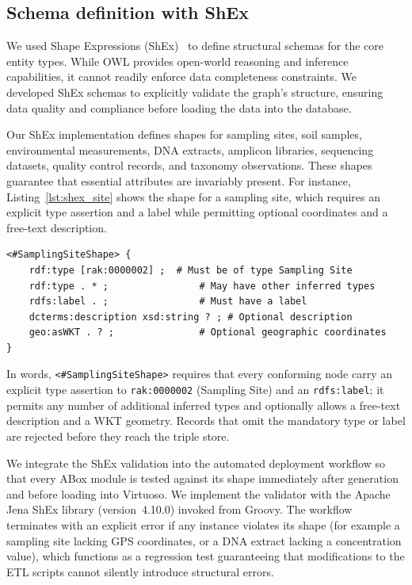 \documentclass[11pt,a4paper]{article}
\begin{document}
\subsection{Schema definition with ShEx}\label{subsec:shex}

We used Shape Expressions (ShEx)~\cite{shex} to define structural
schemas for the core entity types. While OWL provides open-world
reasoning and inference capabilities, it cannot readily enforce data
completeness constraints. We developed ShEx schemas to explicitly
validate the graph's structure, ensuring data quality and compliance
before loading the data into the database.

Our ShEx implementation defines shapes for sampling sites, soil
samples, environmental measurements, DNA extracts, amplicon
libraries, sequencing datasets, quality control records, and
taxonomy observations. These shapes guarantee that essential
attributes are invariably present. For instance,
Listing~\ref{lst:shex_site} shows the shape for a sampling site,
which requires an explicit type assertion and a label while
permitting optional coordinates and a free-text description.

\begin{lstlisting}[caption={ShEx shape for Sampling Site validation.},
  label={lst:shex_site}, basicstyle=\ttfamily\scriptsize, frame=single]
<#SamplingSiteShape> {
    rdf:type [rak:0000002] ;  # Must be of type Sampling Site
    rdf:type . * ;                # May have other inferred types
    rdfs:label . ;                # Must have a label
    dcterms:description xsd:string ? ; # Optional description
    geo:asWKT . ? ;               # Optional geographic coordinates
}
\end{lstlisting}

In words, \texttt{<\#SamplingSiteShape>} requires that every
conforming node carry an explicit type assertion to
\texttt{rak:0000002} (Sampling Site) and an \texttt{rdfs:label}; it
permits any number of additional inferred types and optionally
allows a free-text description and a WKT geometry. Records that
omit the mandatory type or label are rejected before they reach the
triple store.

We integrate the ShEx validation into the automated deployment
workflow so that every ABox module is tested against its shape
immediately after generation and before loading into Virtuoso. We
implement the validator with the Apache Jena ShEx library
(version~4.10.0) invoked from Groovy. The workflow terminates with
an explicit error if any instance violates its shape (for example a
sampling site lacking GPS coordinates, or a DNA extract lacking a
concentration value), which functions as a regression test
guaranteeing that modifications to the ETL scripts cannot silently
introduce structural errors.
\end{document}
